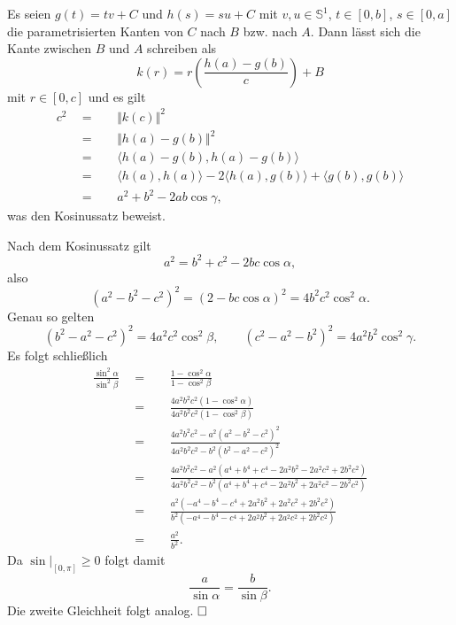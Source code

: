 \documentclass[11pt]{book}
\numberwithin{dummy}{section}
\theoremstyle{nonumberbreak}
\newenvironment{prob}[1][]{\ifthenelse{\equal{#1}{}}{\problem}{\problem[#1]}\rm}{\endproblem}
\newenvironment{sol}[1][]{\ifthenelse{\equal{#1}{}}{\solution}{\solution[#1]}\rm}{\endsolution}
\newcommand{\Sph}{\mathbb{S}}
\begin{document}
\begin{spacing}{1.4}
\begin{prob}
\begin{sol}
\begin{compactenum}
\item Es seien $g(t)=tv+C$ und $h(s)=su+C$ mit $v,u \in \Sph^1$, $t \in [0,b]$, $s \in [0,a]$ die parametrisierten Kanten von $C$ nach $B$ bzw. nach $A$. Dann lässt sich die Kante zwischen $B$ und $A$ schreiben als 
$$k(r)=r \left( \frac{h(a)-g(b)}{c}\right) + B$$
mit $r \in [0,c]$ und es gilt
\begin{alignat*}{5}
c^2 \ \ &=&& \ \ \Vert k(c)\Vert^2 \\
&=&& \ \ \Vert h(a) - g(b)\Vert^2 \\
&=&& \ \ \langle h(a) - g(b), h(a) - g(b)\rangle \\ 
&=&& \ \ \langle h(a), h(a)\rangle - 2 \langle h(a),g(b)\rangle + \langle g(b), g(b)\rangle\\
&=&& \ \ a^2+b^2 - 2ab \cos \gamma,
\end{alignat*}
was den Kosinussatz beweist.
\item Nach dem Kosinussatz gilt
$$a^2=b^2+c^2- 2 b c \cos \alpha,$$
also 
$$(a^2-b^2-c^2)^2 = (2-bc \cos \alpha)^2 = 4 b^2c^2 \cos^2 \alpha.$$
Genau so gelten
$$(b^2-a^2-c^2)^2 = 4a^2c^2 \cos^2 \beta, \qquad (c^2-a^2-b^2)^2 = 4a^2b^2 \cos^2 \gamma.$$
Es folgt schließlich
\begin{alignat*}{5}
\frac{\sin^2 \alpha}{\sin^2 \beta} \ \ &=&& \ \ \frac{1- \cos^2 \alpha}{1- \cos^2 \beta} \\[6pt]
&=&& \ \ \frac{4a^2b^2c^2 (1-\cos^2 \alpha)}{4a^2b^2c^2(1-\cos^2 \beta)} \\[6pt]
&=&& \ \ \frac{4a^2b^2c^2 - a^2 (a^2-b^2-c^2)^2}{4a^2b^2c^2 - b^2(b^2-a^2-c^2)^2} \\[6pt]
&=&& \ \ \frac{4a^2b^2c^2 - a^2(a^4+b^4+c^4-2a^2b^2-2a^2c^2+2b^2c^2)}{4a^2b^2c^2 - b^2(a^4+b^4+c^4-2a^2b^2 + 2a^2c^2 - 2b^2c^2)} \\[6pt]
&=&& \ \ \frac{a^2(-a^4-b^4-c^4+2a^2b^2+2a^2c^2+2b^2c^2)}{b^2(-a^4-b^4-c^4+2a^2b^2 + 2a^2c^2+2b^2c^2)}\\[6pt]
&=&& \ \ \frac{a^2}{b^2}.
\end{alignat*}
Da $\sin\vert_{[0,\pi]} \geqslant 0$ folgt damit 
$$\frac{a}{\sin\alpha} = \frac{b}{\sin\beta}.$$
Die zweite Gleichheit folgt analog. $\hfill \Box$


\end{compactenum}

\end{sol}
\end{prob}










\end{spacing}
\end{document}
